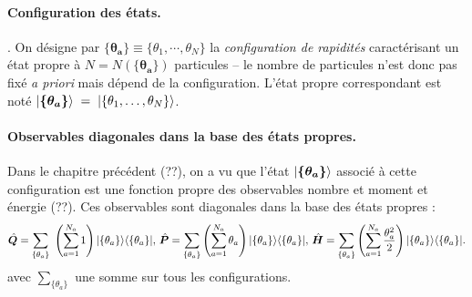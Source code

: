 

\paragraph{Configuration des états.}\label{sec:config-etats}.
On désigne par $\boldsymbol{\{ \theta_a \}}\equiv \{ \theta_1 , \cdots , \theta_{N} \}$ la \emph{configuration de rapidités} caractérisant un état propre à $N\!=\!N(\boldsymbol{\{ \theta_a \}})$ particules – le nombre de particules n’est donc pas fixé \emph{a priori} mais dépend de la configuration.  
L’état propre correspondant est noté $\ket{\boldsymbol{\{ \theta_a \}}}\;=\;\ket{\{\theta_1,\dots,\theta_N \}}$.

\paragraph{Observables diagonales dans la base des états propres.}
Dans le chapitre précédent (??), on a vu que l'état $\ket{\boldsymbol{\{ \theta_a \}}}$ associé à cette configuration est une fonction propre des observables nombre et moment et  énergie (??). Ces observables sont diagonales dans la base des états propres :
\begin{eqnarray}
	\operator{Q}  =  \sum_{ \{\theta_a\} } \left ( \sum_{a = 1}^{N_a}  1 \right )  \vert \{ \theta_a\}\rangle	\langle \{ \theta_a \}\vert, \, 
	\operator{P}  =  \sum_{\{ \theta_a\}}\left( \sum_{a = 1}^{N_a}  \theta_a \right )   \vert \{ \theta_a\}\rangle	\langle \{ \theta_a \}\vert,\,\operator{H}  =  \sum_{\{ \theta_a\}}\left ( \sum_{a = 1}^{N_a} \frac{\theta_a^2}{2} \right )   \vert \{ \theta_a\}\rangle	\langle \{ \theta_a \}\vert.\label{chap.2.gge.1}		
\end{eqnarray}
avec $ \sum_{\{ \theta_a\}}$ une somme sur tous les configurations.\\





